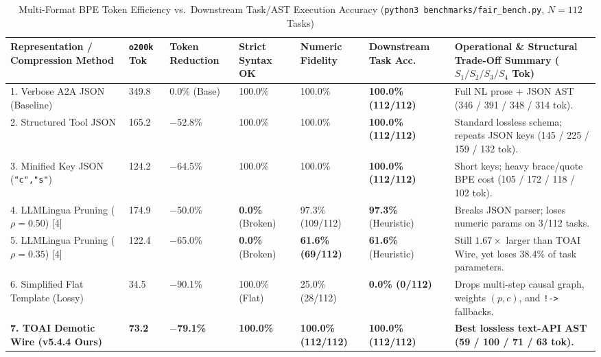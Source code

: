 \documentclass[9pt,a4paper]{extarticle}
\begin{document}
\begin{table}[h!]
\centering
\caption{Multi-Format BPE Token Efficiency vs.\ Downstream Task/AST Execution Accuracy (\texttt{python3 benchmarks/fair\_bench.py}, $N=112$ Tasks)}
\label{tab:fair_bench}
\footnotesize
\renewcommand{\arraystretch}{0.96}
\setlength{\tabcolsep}{2.5pt}
\begin{tabularx}{\textwidth}{L{3.6cm} R{1.3cm} R{1.6cm} C{1.6cm} C{1.7cm} C{1.8cm} Y}
\toprule
{}
\textbf{\color{white}Representation / Compression Method} &
\textbf{\color{white}\texttt{o200k} Tok} &
\textbf{\color{white}Token Reduction} &
\textbf{\color{white}Strict Syntax OK} &
\textbf{\color{white}Numeric Fidelity} &
\textbf{\color{white}Downstream Task Acc.} &
\textbf{\color{white}Operational \& Structural Trade-Off Summary ($S_1 / S_2 / S_3 / S_4$ Tok)} \\
. Verbose A2A JSON (Baseline) & 349.8 & 0.0\% (Base) & 100.0\% & 100.0\% & \textbf{100.0\% (112/112)} & Full NL prose + JSON AST (346 / 391 / 348 / 314 tok). \\
2. Structured Tool JSON & 165.2 & $-$52.8\% & 100.0\% & 100.0\% & \textbf{100.0\% (112/112)} & Standard lossless schema; repeats JSON keys (145 / 225 / 159 / 132 tok). \\
3. Minified Key JSON (\texttt{"c","s"}) & 124.2 & $-$64.5\% & 100.0\% & 100.0\% & \textbf{100.0\% (112/112)} & Short keys; heavy brace/quote BPE cost (105 / 172 / 118 / 102 tok). \\
4. LLMLingua Pruning ($\rho=0.50$) [4] & 174.9 & $-$50.0\% & \textbf{0.0\%} (Broken) & 97.3\% (109/112) & \textbf{97.3\%} (Heuristic) & Breaks JSON parser; loses numeric params on 3/112 tasks. \\
5. LLMLingua Pruning ($\rho=0.35$) [4] & 122.4 & $-$65.0\% & \textbf{0.0\%} (Broken) & \textbf{61.6\% (69/112)} & \textbf{61.6\%} (Heuristic) & Still $1.67\times$ larger than TOAI Wire, yet loses 38.4\% of task parameters. \\
6. Simplified Flat Template (Lossy) & 34.5 & $-$90.1\% & 100.0\% (Flat) & 25.0\% (28/112) & \textbf{0.0\% (0/112)} & Drops multi-step causal graph, weights $(p, c)$, and \texttt{!->} fallbacks. \\
\textbf{7. TOAI Demotic Wire (v5.4.4 Ours)} & \textbf{73.2} & \textbf{$-$79.1\%} & \textbf{100.0\%} & \textbf{100.0\% (112/112)} & \textbf{100.0\% (112/112)} & \textbf{Best lossless text-API AST (59 / 100 / 71 / 63 tok).} \\
\bottomrule
\end{tabularx}
\end{table}
\end{document}
